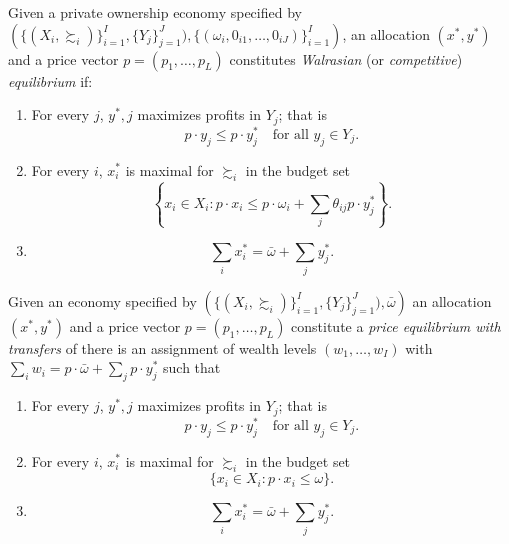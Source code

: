 \begin{defn}
    Given a private ownership economy specified by $\left(\{(X_i, \succsim_i)\}_{i = 1}^I, \{Y_j\}_{j = 1}^J), \{(\omega_i, 0_{i1}, \dots, 0_{iJ})\}_{i = 1}^I\right)$, an allocation $(x^*, y^*)$ and a price vector $p = (p_1, \dots, p_L)$ constitutes \emph{Walrasian} (or \emph{competitive}) \emph{equilibrium} if:
    \begin{enumerate}
        \item 
        For every $j$, $y^*, j$ maximizes profits in $Y_j$; that is
        \begin{equation*}
            p \cdot y_j \leq p \cdot y^*_j \quad \text{for all } y_j \in Y_j.
        \end{equation*}
        
        \item 
        For every $i$, $x^*_i$ is maximal for $\succsim_i$ in the budget set
        \begin{equation*}
            \left\{x_i \in X_i : p \cdot x_i \leq p \cdot \omega_i + \sum_j \theta_{ij} p \cdot y^*_j \right\}.
        \end{equation*}

        \item 
        \begin{equation*}
            \sum_i x^*_i = \bar{\omega} + \sum_j y^*_j.
        \end{equation*}
    \end{enumerate}
\end{defn}

\begin{defn}
    Given an economy specified by $\left(\{(X_i, \succsim_i)\}_{i = 1}^I, \{Y_j\}_{j = 1}^J), \bar{\omega}\right)$ an allocation $(x^*, y^*)$ and a price vector $p = (p_1, \dots, p_L)$ constitute a \emph{price equilibrium with transfers} of there is an assignment of wealth levels $(w_1, \dots, w_I)$ with $\sum_i w_i = p \cdot \bar{\omega} + \sum_j p \cdot y^*_j$ such that
    \begin{enumerate}
        \item 
        For every $j$, $y^*, j$ maximizes profits in $Y_j$; that is
        \begin{equation*}
            p \cdot y_j \leq p \cdot y^*_j \quad \text{for all } y_j \in Y_j.
        \end{equation*}
        
        \item 
        For every $i$, $x^*_i$ is maximal for $\succsim_i$ in the budget set
        \begin{equation*}
            \{x_i \in X_i : p \cdot x_i \leq \omega\}.
        \end{equation*}

        \item 
        \begin{equation*}
            \sum_i x^*_i = \bar{\omega} + \sum_j y^*_j.
        \end{equation*}
    \end{enumerate}
\end{defn}



